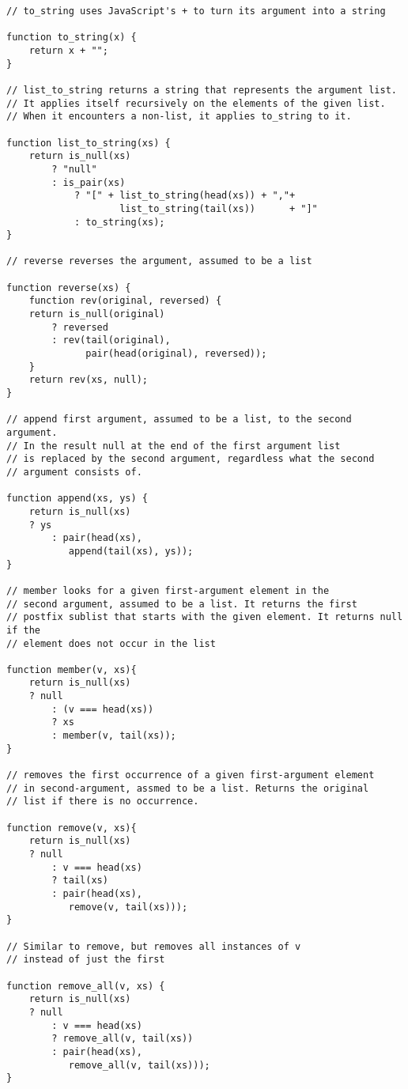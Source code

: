 \begin{lstlisting}
// to_string uses JavaScript's + to turn its argument into a string

function to_string(x) {
    return x + "";
}

// list_to_string returns a string that represents the argument list.
// It applies itself recursively on the elements of the given list.
// When it encounters a non-list, it applies to_string to it.

function list_to_string(xs) {
    return is_null(xs)
        ? "null"
        : is_pair(xs)
            ? "[" + list_to_string(head(xs)) + ","+
                    list_to_string(tail(xs))      + "]"
            : to_string(xs);
}

// reverse reverses the argument, assumed to be a list

function reverse(xs) {
    function rev(original, reversed) {
	return is_null(original)
	    ? reversed
	    : rev(tail(original), 
	          pair(head(original), reversed));
    }
    return rev(xs, null);
}

// append first argument, assumed to be a list, to the second argument.
// In the result null at the end of the first argument list
// is replaced by the second argument, regardless what the second
// argument consists of.

function append(xs, ys) {
    return is_null(xs)
	? ys
        : pair(head(xs),
	       append(tail(xs), ys));
} 

// member looks for a given first-argument element in the 
// second argument, assumed to be a list. It returns the first 
// postfix sublist that starts with the given element. It returns null if the 
// element does not occur in the list

function member(v, xs){
    return is_null(xs)
	? null
        : (v === head(xs))
	    ? xs
	    : member(v, tail(xs));
}

// removes the first occurrence of a given first-argument element
// in second-argument, assmed to be a list. Returns the original 
// list if there is no occurrence.

function remove(v, xs){
    return is_null(xs)
	? null
        : v === head(xs)
	    ? tail(xs)
	    : pair(head(xs), 
		   remove(v, tail(xs)));
}

// Similar to remove, but removes all instances of v
// instead of just the first

function remove_all(v, xs) {
    return is_null(xs)
	? null
        : v === head(xs)
	    ? remove_all(v, tail(xs))
	    : pair(head(xs), 
	  	   remove_all(v, tail(xs)));
}


\end{lstlisting}

